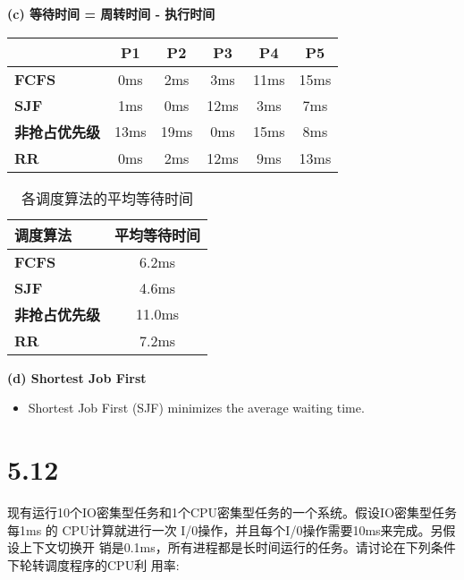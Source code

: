\documentclass[UTF8]{homework}
\begin{document}
\begin{homeworkProblem}
    \vspace{1cm}
    
    \textbf{(c) 等待时间 = 周转时间 - 执行时间}
    
    \begin{table}[H]
    \centering
    \begin{tabular}{@{}l|ccccc@{}}
    \toprule
              & \textbf{P1} & \textbf{P2} & \textbf{P3} & \textbf{P4} & \textbf{P5} \\ \midrule
    \textbf{FCFS}       & 0ms  & 2ms  & 3ms  & 11ms & 15ms \\
    \textbf{SJF}        & 1ms  & 0ms  & 12ms & 3ms  & 7ms  \\
    \textbf{非抢占优先级} & 13ms & 19ms & 0ms  & 15ms & 8ms  \\
    \textbf{RR}         & 0ms  & 2ms  & 12ms & 9ms  & 13ms \\ \bottomrule
    \end{tabular}
    \end{table}

\vspace{1cm}

\begin{table}[H]
    \centering
    \begin{tabular}{@{}l|c@{}}
    \toprule
    \textbf{调度算法} & \textbf{平均等待时间} \\ \midrule
    \textbf{FCFS}       & 6.2ms \\
    \textbf{SJF}        & 4.6ms \\
    \textbf{非抢占优先级} & 11.0ms \\
    \textbf{RR}         & 7.2ms \\ \bottomrule
    \end{tabular}
    \caption{各调度算法的平均等待时间}
    \end{table}
    

\textbf{(d) Shortest Job First}
\begin{itemize}
    \item Shortest Job First (SJF) minimizes the average waiting time.
\end{itemize}

\section{5.12}

现有运行10个IO密集型任务和1个CPU密集型任务的一个系统。假设IO密集型任务每1ms
的 CPU计算就进行一次 I/0操作，并且每个I/0操作需要10ms来完成。另假设上下文切换开
销是0.1ms，所有进程都是长时间运行的任务。请讨论在下列条件下轮转调度程序的CPU利
用率:


\end{homeworkProblem}
\end{document}
